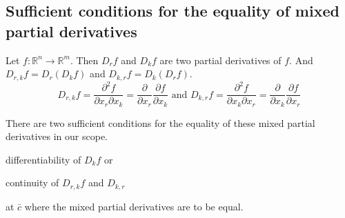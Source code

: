 \subsection{Sufficient conditions for the equality of mixed partial derivatives}
Let $f : \mathbb{R}^n \to \mathbb{R}^m$.
Then $D_r f$ and $D_k f$ are two partial derivatives of $f$.
And $D_{r,k} f = D_r(D_k f)$ and $D_{k,r} f = D_k (D_r f)$.
\[ D_{r,k} f = \frac{\partial^2 f}{\partial x_r \partial x_k} = \frac{\partial}{\partial x_r} \frac{\partial f}{\partial x_k} \text{ and } D_{k,r} f = \frac{\partial^2 f}{\partial x_k \partial x_r} = \frac{\partial}{\partial x_k} \frac{\partial f}{\partial x_r}  \]
\begin{commentary}
	There are two sufficient conditions for the equality of these mixed partial derivatives in our scope.
\begin{enumerate*}
	\item differentiability of $D_k f$ or
	\item continuity of $D_{r,k} f$ and $D_{k,r}$
\end{enumerate*}
at $\bar{c}$ where the mixed partial derivatives are to be equal.
\end{commentary}

